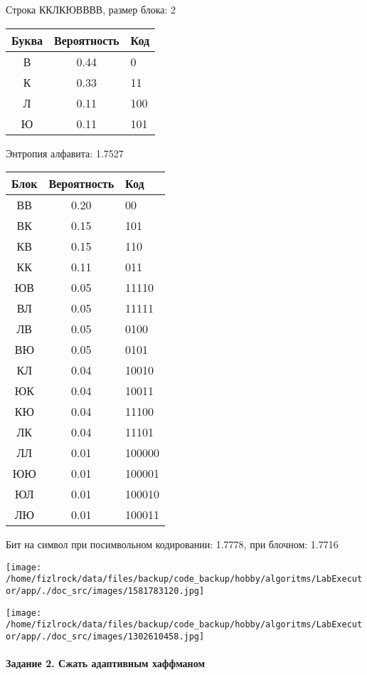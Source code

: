 \documentclass[a4paper, 12pt]{article}
\begin{document}
Строка ККЛКЮВВВВ, размер блока: 2
\begin{center}
 \begin{tabular}{ |c|c|l| } 
  \hline
     Буква & Вероятность & Код\\ \hline
В & 0.44 & 0\\\hline
К & 0.33 & 11\\\hline
Л & 0.11 & 100\\\hline
Ю & 0.11 & 101
\\ \hline \end{tabular}
\end{center}
Энтропия алфавита: 1.7527
\begin{center}
 \begin{tabular}{ |c|c|l| } 
  \hline
     Блок & Вероятность & Код\\ \hline
ВВ & 0.20 & 00\\\hline
ВК & 0.15 & 101\\\hline
КВ & 0.15 & 110\\\hline
КК & 0.11 & 011\\\hline
ЮВ & 0.05 & 11110\\\hline
ВЛ & 0.05 & 11111\\\hline
ЛВ & 0.05 & 0100\\\hline
ВЮ & 0.05 & 0101\\\hline
КЛ & 0.04 & 10010\\\hline
ЮК & 0.04 & 10011\\\hline
КЮ & 0.04 & 11100\\\hline
ЛК & 0.04 & 11101\\\hline
ЛЛ & 0.01 & 100000\\\hline
ЮЮ & 0.01 & 100001\\\hline
ЮЛ & 0.01 & 100010\\\hline
ЛЮ & 0.01 & 100011
\\ \hline \end{tabular}
\end{center}
Бит на символ при посимвольном кодировании: 1.7778, при блочном: 1.7716

\texttt{[image: /home/fizlrock/data/files/backup/code\_backup/hobby/algoritms/LabExecutor/app/./doc\_src/images/1581783120.jpg]}

\texttt{[image: /home/fizlrock/data/files/backup/code\_backup/hobby/algoritms/LabExecutor/app/./doc\_src/images/1302610458.jpg]}
\pagebreak
\paragraph{Задание 2. Сжать адаптивным хаффманом\\}
\end{document}
